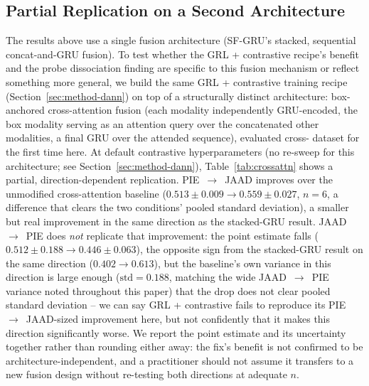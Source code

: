 \subsection{Partial Replication on a Second Architecture}
\label{sec:results-crossattn}

The results above use a single fusion architecture (SF-GRU's stacked,
sequential concat-and-GRU fusion). To test whether the GRL + contrastive
recipe's benefit and the probe dissociation finding are specific to
this fusion mechanism or reflect something more general, we build the
same GRL + contrastive training recipe (Section~\ref{sec:method-dann})
on top of a structurally distinct architecture: box-anchored
cross-attention fusion (each modality independently GRU-encoded, the
box modality serving as an attention query over the concatenated other
modalities, a final GRU over the attended sequence), evaluated cross-
dataset for the first time here. At default contrastive
hyperparameters (no re-sweep for this architecture; see
Section~\ref{sec:method-dann}), Table~\ref{tab:crossattn} shows a
partial, direction-dependent replication. PIE~$\to$~JAAD improves over
the unmodified cross-attention baseline ($0.513\pm0.009 \to
0.559\pm0.027$, $n=6$, a difference that clears the two conditions'
pooled standard deviation), a smaller but real improvement in the same
direction as the stacked-GRU result. JAAD~$\to$~PIE does \emph{not}
replicate that improvement: the point estimate falls
($0.512\pm0.188 \to 0.446\pm0.063$), the opposite sign from the
stacked-GRU result on the same direction ($0.402\to0.613$), but the
baseline's own variance in this direction is large enough
($\text{std}=0.188$, matching the wide JAAD~$\to$~PIE variance noted
throughout this paper) that the drop does not clear pooled standard
deviation -- we can say GRL + contrastive fails to reproduce its
PIE~$\to$~JAAD-sized improvement here, but not confidently that it
makes this direction significantly worse. We report the point estimate
and its uncertainty together rather than rounding either away: the
fix's benefit is not confirmed to be architecture-independent, and a
practitioner should not assume it transfers to a new fusion design
without re-testing both directions at adequate $n$.

